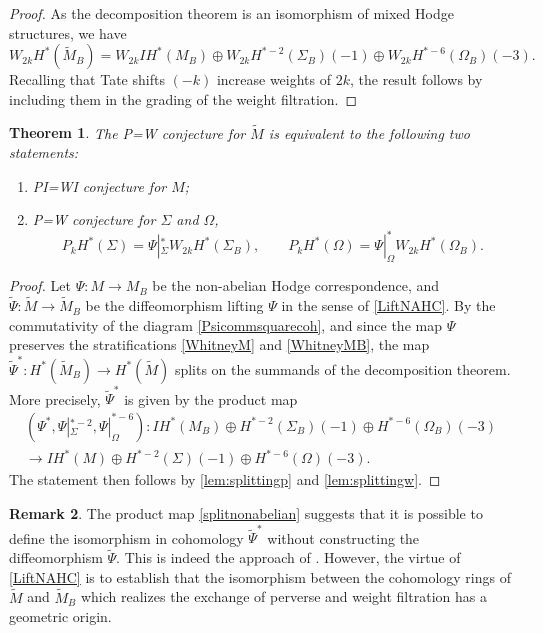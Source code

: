 \documentclass[JEP,XML,SOM,Unicode, NoEqCountersInSection,NoFloatCountersInSection,published]{cedram}
\newcommand{\IH}{\mathit{IH}}
\newtheorem{thm}{Theorem}[section]
\theoremstyle{definition}
\newtheorem{rmk}[thm]{Remark}
\newcommand{\tm}{\widetilde{M}}
\begin{document}
\begin{proof}
As the decomposition theorem is an isomorphism of mixed Hodge structures, we have
\[
W_{2k} H^*(\widetilde{M}_B)=W_{2k}\IH^*(M_B)\oplus W_{2k}H^{*-2}(\Sigma_B)(-1)\oplus W_{2k}H^{*-6}(\Omega_B)(-3).
\]
Recalling that Tate shifts $(-k)$ increase weights of $2k$, the result follows by including them in the grading of the weight filtration.
\end{proof}
\begin{thm}\label{cor:splitting}
The P=W conjecture for $\tm$ is equivalent to the following two statements:
\begin{enumerate}
\item PI=WI conjecture for $M$;
\item P=W conjecture for $\Sigma$ and $\Omega$, \ie
\[
P_{k}H^{*}(\Sigma)=\Psi|_\Sigma^* W_{2k}H^*(\Sigma_B), \qquad P_{k}H^{*}(\Omega)=\Psi|_\Omega^*W_{2k}H^*(\Omega_B).
\]
\end{enumerate}
\end{thm}
\begin{proof}
Let $\Psi\colon\! M\!\to\!M_B$ be the non-abelian Hodge correspondence, and~\hbox{$\widetilde{\Psi}\colon\! \widetilde{M}\!\to\!\widetilde{M}_B$} be the diffeomorphism lifting $\Psi$ in the sense of \cref{LiftNAHC}. By the commutativity of the diagram \eqref{Psicommsquarecoh}, and since the map $\Psi$ preserves the stratifications \eqref{WhitneyM} and \eqref{WhitneyMB}, the map $\widetilde{\Psi}^*\colon H^*(\widetilde{M}_B) \to H^*(\tm)$ splits on the summands of the decomposition theorem. More precisely, $\widetilde{\Psi}^*$ is given by the product map
\begin{multline}
(\Psi^*, \Psi|_{\Sigma}^{*-2}, \Psi|^{*-6}_{\Omega})\colon \IH^*(M_B) \oplus H^{*-2}(\Sigma_B)(-1)\oplus H^{*-6}(\Omega_B)(-3) \label{splitnonabelian}\\
\to \IH^*(M)\oplus H^{*-2}(\Sigma)(-1)\oplus H^{*-6}(\Omega)(-3).
\end{multline}
The statement then follows by \cref{lem:splittingp} and \cref{lem:splittingw}.
\end{proof}
\begin{rmk}
The product map \eqref{splitnonabelian} suggests that it is possible to define the isomorphism in cohomology $\widetilde{\Psi}^*$ without constructing the diffeomorphism $\widetilde{\Psi}$. This is indeed the approach of \cite{deCataldoHauselMigliorini2013}. However, the virtue of \cref{LiftNAHC} is to establish that the isomorphism between the cohomology rings of $\widetilde{M}$ and $\widetilde{M}_B$ which realizes the exchange of perverse and weight filtration has a geometric origin.
\end{rmk}
\end{document}
